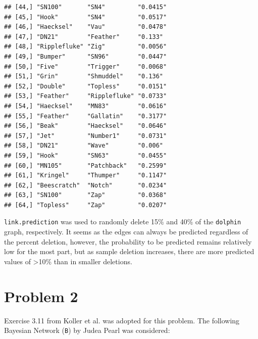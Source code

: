 \documentclass[]{article}
\begin{document}
\begin{verbatim}
## [44,] "SN100"       "SN4"         "0.0415"             
## [45,] "Hook"        "SN4"         "0.0517"             
## [46,] "Haecksel"    "Vau"         "0.0478"             
## [47,] "DN21"        "Feather"     "0.133"              
## [48,] "Ripplefluke" "Zig"         "0.0056"             
## [49,] "Bumper"      "SN96"        "0.0447"             
## [50,] "Five"        "Trigger"     "0.0068"             
## [51,] "Grin"        "Shmuddel"    "0.136"              
## [52,] "Double"      "Topless"     "0.0151"             
## [53,] "Feather"     "Ripplefluke" "0.0733"             
## [54,] "Haecksel"    "MN83"        "0.0616"             
## [55,] "Feather"     "Gallatin"    "0.3177"             
## [56,] "Beak"        "Haecksel"    "0.0646"             
## [57,] "Jet"         "Number1"     "0.0731"             
## [58,] "DN21"        "Wave"        "0.006"              
## [59,] "Hook"        "SN63"        "0.0455"             
## [60,] "MN105"       "Patchback"   "0.2599"             
## [61,] "Kringel"     "Thumper"     "0.1147"             
## [62,] "Beescratch"  "Notch"       "0.0234"             
## [63,] "SN100"       "Zap"         "0.0368"             
## [64,] "Topless"     "Zap"         "0.0207"
\end{verbatim}

\texttt{link.prediction} was used to randomly delete 15\% and 40\% of
the \texttt{dolphin} graph, respectively. It seems as the edges can
always be predicted regardless of the percent deletion, however, the
probability to be predicted remains relatively low for the most part,
but as sample deletion increases, there are more predicted values of
\textgreater{}10\% than in smaller deletions.

\section{Problem 2}\label{problem-2}

Exercise 3.11 from Koller et al. was adopted for this problem. The
following Bayesian Network (\texttt{B}) by Judea Pearl was considered:
\end{document}
